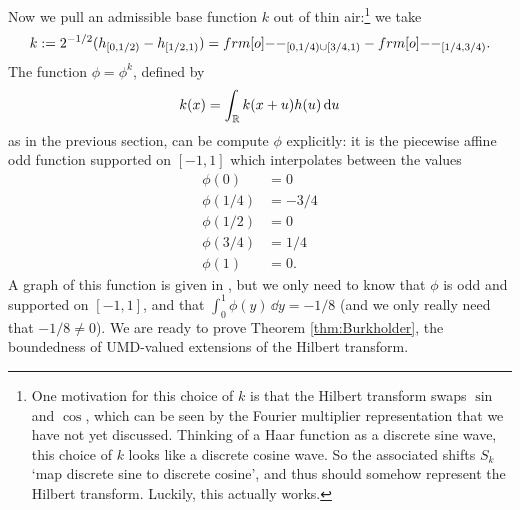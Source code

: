 {Now we pull an admissible base function $k$ out of thin air:\footnote{One motivation for this choice of $k$ is that the Hilbert transform swaps $\sin$ and $\cos$, which can be seen by the Fourier multiplier representation that we have not yet discussed. Thinking of a Haar function as a discrete sine wave, this choice of $k$ looks like a discrete cosine wave. So the associated shifts $S_{k}$ `map discrete sine to discrete cosine', and thus should somehow represent the Hilbert transform. Luckily, this actually works.} we take
\begin{equation*}
  k := 2^{-1/2}(h_{[0,1/2)} - h_{[1/2,1)}) = \1_{[0,1/4) \cup [3/4,1)} -\1_{[1/4, 3/4)}.
\end{equation*}
The function $\phi = \phi^{k}$, defined by
\begin{equation*}
  k(x) = \int_{\mathbb{R}} k(x+u)h(u) \, \mathrm{d} u
\end{equation*}
as in the previous section, can be compute $\phi$ explicitly: it is the piecewise affine odd function supported on $[-1,1]$ which interpolates between the values
\begin{equation*}
  \begin{aligned}
    \phi(0) &= 0 \\
    \phi(1/4) &= -3/4 \\
    \phi(1/2) &= 0 \\
    \phi(3/4) &= 1/4 \\
    \phi(1) &= 0.
  \end{aligned}
\end{equation*}
A graph of this function is given in \cite[Figure 5.1]{HNVW16}, but we only need to know that $\phi$ is odd and supported on $[-1,1]$, and that $\int_{0}^{1} \phi(y) \, \dd y = -1/8$ (and we only really need that $-1/8 \neq 0$).
We are ready to prove Theorem \ref{thm:Burkholder}, the boundedness of UMD-valued extensions of the Hilbert transform.

}
